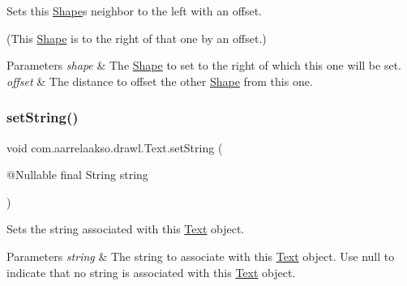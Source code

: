 Sets this \hyperlink{classcom_1_1aarrelaakso_1_1drawl_1_1_shape}{Shape}\textquotesingle{}s neighbor to the left with an offset. 

(This \hyperlink{classcom_1_1aarrelaakso_1_1drawl_1_1_shape}{Shape} is to the right of that one by an offset.)


\begin{DoxyParams}{Parameters}
{\em shape} & The \hyperlink{classcom_1_1aarrelaakso_1_1drawl_1_1_shape}{Shape} to set to the right of which this one will be set. \\
\hline
{\em offset} & The distance to offset the other \hyperlink{classcom_1_1aarrelaakso_1_1drawl_1_1_shape}{Shape} from this one. \\
\hline
\end{DoxyParams}
\mbox{\label{classcom_1_1aarrelaakso_1_1drawl_1_1_text_a8fec7a478b7a7f4a141e36ee52a66a42}} 
\subsubsection{\texorpdfstring{set\+String()}{setString()}}
{\footnotesize\ttfamily void com.\+aarrelaakso.\+drawl.\+Text.\+set\+String (\begin{DoxyParamCaption}\item[{@Nullable final String}]{string }\end{DoxyParamCaption})}



Sets the string associated with this \hyperlink{classcom_1_1aarrelaakso_1_1drawl_1_1_text}{Text} object. 


\begin{DoxyParams}{Parameters}
{\em string} & The string to associate with this \hyperlink{classcom_1_1aarrelaakso_1_1drawl_1_1_text}{Text} object. Use {\ttfamily null} to indicate that no string is associated with this \hyperlink{classcom_1_1aarrelaakso_1_1drawl_1_1_text}{Text} object. \\
\hline
\end{DoxyParams}
\mbox{\label{classcom_1_1aarrelaakso_1_1drawl_1_1_shape_a75685cbfea36858836df8e1fb4f8b821}} 

